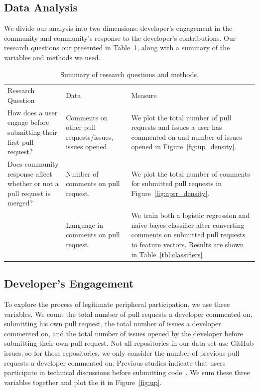 \documentclass{sigchi}
\begin{document}
\subsection{Data Analysis} \label{sec:data_analysis}

We divide our analysis into two dimensions: developer's engagement in the
community and community's response to the developer's contributions. Our
research questions our presented in Table~\ref{tbl:research_questions}, along
with a summary of the variables and methods we used.

\begin{table}[ht] \centering
\caption{Summary of research questions and methods.}
\label{tbl:research_questions}
\begin{tabular}{ p{2.1in} p{2.1in} p{2.3in} }
\hline\hline
Research Question
& Data                                  & Measure
\\
How does a user engage before submitting their first pull request?  &
Comments on other pull requests/issues, issues opened.      & We plot the total
number of pull requests and issues a user has commented on and number of issues
opened in Figure~\ref{fig:up_density}.
\\
Does community response affect whether or not a pull request is
merged? & Number of comments on pull request.   & We plot the
total number of comments for submitted pull requests in
Figure~\ref{fig:aprr_density}.
\\
~
& Language in comments on pull request. & We train both a
logistic regression and naive bayes classifier after
converting comments on submitted pull requests to feature
vectors. Results are shown in
Table~\ref{tbl:classifiers} \\
\hline
\end{tabular}
\end{table}

\subsection{Developer's Engagement}
To explore the process of legitimate peripheral participation, we use three
variables. We count the
total number of pull requests a developer commented on, submitting his own
pull request, the total number of issues a developer commented on, and the total
number of issues opened by the developer before submitting their own pull
request. Not all repositories in our data set use GitHub issues, so for those
repositories, we only consider the number of previous pull requests a developer
commented on. Previous studies indicate that users participate in technical
discussions before submitting code~\cite{von_krogh_community_2003}. We sum these
three variables together and plot the it in Figure~\ref{fig:up}.
\end{document}
